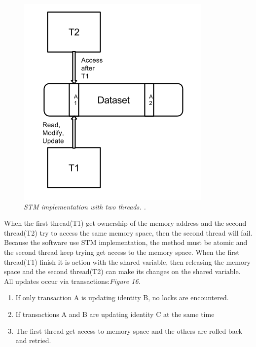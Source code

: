 \documentclass[12pt]{article}
\begin{document}
\begin{figure}[h!]
\centering
\includegraphics[scale=0.25]{Pictures/STMtwoThreads.png}
\caption{\textit{\color{gray}STM implementation with two threads. \cite{Dennis}.}}
\end{figure}


When the first thread(T1) get ownership of the memory address and the second thread(T2) try to access the same memory space, then the second thread will fail. Because the software use STM implementation, the method must be atomic and the second thread keep trying get access to the memory space. When the first thread(T1) finish it is action with the shared variable, then releasing the memory space and the second thread(T2) can make its changes on the shared variable.\cite{Dennis} \\


{\setlength{\parindent}{0cm}
All updates occur via transactions:\cite{Kenneth}\textit{\color{gray}Figure 16.}}
\begin{enumerate}
\item If only transaction A is updating identity B, no locks are encountered.   
\item If transactions A and B are updating identity C at the same time
\item The first thread get access to memory space and the others are rolled back and retried.
\end{enumerate}
\end{document}
